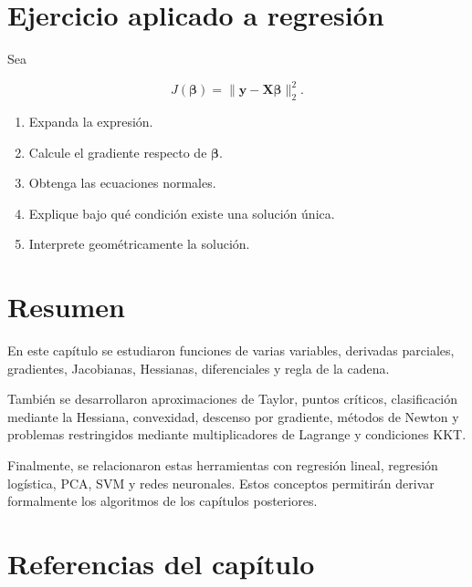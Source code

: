 \documentclass[
  spanish,
  10.5pt,
  letterpaper,
  DIV=11,
  numbers=noendperiod,
  oneside,
  open=any]{scrreprt}
\providecommand{\tightlist}{%
  \setlength{\itemsep}{0pt}\setlength{\parskip}{0pt}}
\theoremstyle{definition}
\theoremstyle{definition}
\theoremstyle{plain}
\theoremstyle{remark}
\begin{document}
\section*{Ejercicio aplicado a
regresión}\label{ejercicio-aplicado-a-regresiuxf3n}


Sea

\[
J(\boldsymbol{\beta})
=
\|
\mathbf{y}
-
\mathbf{X}\boldsymbol{\beta}
\|_2^2.
\]

\begin{enumerate}
\def\labelenumi{\arabic{enumi}.}
\tightlist
\item
  Expanda la expresión.
\item
  Calcule el gradiente respecto de \(\boldsymbol{\beta}\).
\item
  Obtenga las ecuaciones normales.
\item
  Explique bajo qué condición existe una solución única.
\item
  Interprete geométricamente la solución.
\end{enumerate}

\section*{Resumen}\label{resumen-3}


En este capítulo se estudiaron funciones de varias variables, derivadas
parciales, gradientes, Jacobianas, Hessianas, diferenciales y regla de
la cadena.

También se desarrollaron aproximaciones de Taylor, puntos críticos,
clasificación mediante la Hessiana, convexidad, descenso por gradiente,
métodos de Newton y problemas restringidos mediante multiplicadores de
Lagrange y condiciones KKT.

Finalmente, se relacionaron estas herramientas con regresión lineal,
regresión logística, PCA, SVM y redes neuronales. Estos conceptos
permitirán derivar formalmente los algoritmos de los capítulos
posteriores.

\section*{Referencias del capítulo}\label{referencias-del-capuxedtulo-3}
\end{document}
